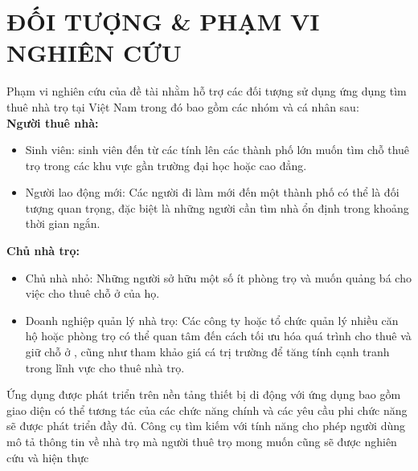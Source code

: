 \section{ĐỐI TƯỢNG \& PHẠM VI NGHIÊN CỨU}
Phạm vi nghiên cứu của đề tài nhằm hỗ trợ các đối tượng sử dụng ứng dụng tìm thuê nhà trọ tại Việt Nam trong đó bao gồm các nhóm và cá nhân sau:\\
\textbf{Người thuê nhà:}
\begin{itemize}
    \item Sinh viên: sinh viên đến từ các tính lên các thành phố lớn muốn tìm chỗ thuê trọ  trong các khu vực gần trường đại học hoặc cao đẳng.
    \item Người lao động mới: Các người đi làm mới đến một thành phố có thể là đối tượng quan trọng, đặc biệt là những người cần tìm nhà ổn định trong khoảng thời gian ngắn.
\end{itemize}
\textbf{Chủ nhà trọ:}
\begin{itemize}
    \item Chủ nhà nhỏ: Những người sở hữu một số ít phòng trọ và muốn quảng bá cho việc cho thuê chỗ ở của họ.
    \item Doanh nghiệp quản lý nhà trọ: Các công ty hoặc tổ chức quản lý nhiều căn hộ hoặc phòng trọ có thể quan tâm đến cách tối ưu hóa quá trình cho thuê và giữ chỗ ở , cũng như tham khảo giá cá trị trường để tăng tính cạnh tranh trong lĩnh vực cho thuê nhà trọ.
\end{itemize}
Ứng dụng được phát triển trên nền tảng thiết bị di động với ứng dụng bao gồm giao diện có thể tương tác của các chức năng chính và các yêu cầu phi chức năng sẽ được phát triển đầy đủ. Công cụ tìm kiếm với tính năng cho phép người dùng mô tả thông tin về nhà trọ mà người thuê trọ mong muốn cũng sẽ được nghiên cứu và hiện thực